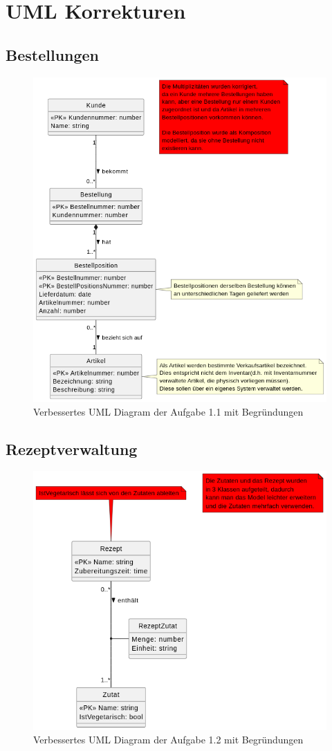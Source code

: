 \documentclass[12pt]{scrartcl}
\begin{document}
\section{UML Korrekturen}
\subsection{Bestellungen}
\begin{figure}[ht]
    \centering
    \includegraphics[width=0.9\linewidth]{../UE1_1_1.png}
    \caption{Verbessertes UML Diagram der Aufgabe 1.1 mit Begründungen}
\end{figure}
\pagebreak
\subsection{Rezeptverwaltung}
\begin{figure}[ht]
    \centering
    \includegraphics[width=0.9\linewidth]{../UE1_1_2.png}
    \caption{Verbessertes UML Diagram der Aufgabe 1.2 mit Begründungen}
\end{figure}
\pagebreak
\end{document}

